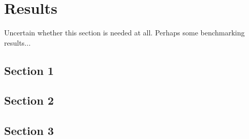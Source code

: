 \chapter{Results}
Uncertain whether this section is needed at all. Perhaps some benchmarking
results...
\section{Section 1}
\section{Section 2}
\section{Section 3}